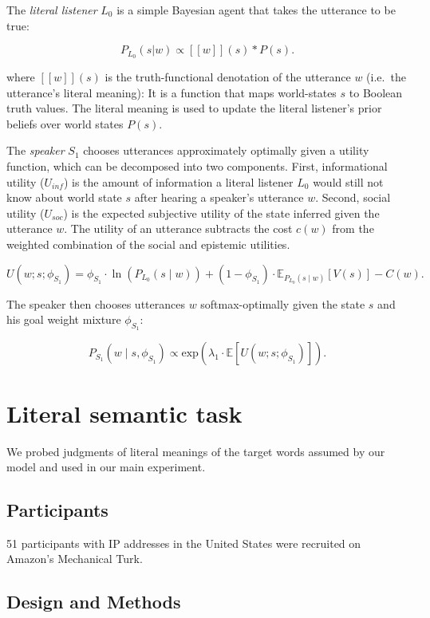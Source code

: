 \documentclass[oneside]{report}
\begin{document}
The \emph{literal listener} \(L_0\) is a simple Bayesian agent that
takes the utterance to be true:

\[P_{L_0}(s | w) \propto [\![ w ]\!] (s) * P(s).\]

\noindent where \([\![ w ]\!](s)\) is the truth-functional denotation of
the utterance \(w\) (i.e.~the utterance's literal meaning): It is a
function that maps world-states \(s\) to Boolean truth values. The
literal meaning is used to update the literal listener's prior beliefs
over world states \(P(s)\).

The \emph{speaker} \(S_1\) chooses utterances approximately optimally
given a utility function, which can be decomposed into two components.
First, informational utility (\(U_{inf}\)) is the amount of information
a literal listener \(L_0\) would still not know about world state \(s\)
after hearing a speaker's utterance \(w\). Second, social utility
(\(U_{soc}\)) is the expected subjective utility of the state inferred
given the utterance \(w\). The utility of an utterance subtracts the
cost \(c(w)\) from the weighted combination of the social and epistemic
utilities.

\[U(w; s; \phi_{S_1}) = \phi_{S_1} \cdot \ln(P_{L_0}(s \mid w)) + (1 - \phi_{S_1}) \cdot \mathbb{E}_{P_{L_0}(s \mid w)}[V(s)] - C(w).\]

\noindent The speaker then chooses utterances \(w\) softmax-optimally
given the state \(s\) and his goal weight mixture \(\phi_{S_1}\):

\[P_{S_1}(w \mid s, \phi_{S_1}) \propto \mathrm{exp}(\lambda_{1} \cdot \mathbb{E}[U(w; s; \phi_{S_1})]).\]

\section{Literal semantic task}\label{literal-semantic-task}

We probed judgments of literal meanings of the target words assumed by
our model and used in our main experiment.

\subsection{Participants}\label{participants-5}

51 participants with IP addresses in the United States were recruited on
Amazon's Mechanical Turk.

\subsection{Design and Methods}\label{design-and-methods-1}
\end{document}
